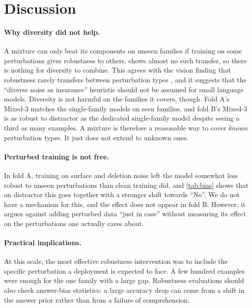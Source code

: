 \documentclass[11pt]{article}
\newcommand{\pfam}[1]{\textsf{#1}}
\begin{document}
\section{Discussion}
\label{sec:discussion}

\paragraph{Why diversity did not help.} A mixture can only beat its components on unseen families if training on some perturbations gives robustness to others.  shows almost no such transfer, so there is nothing for diversity to combine. This agrees with the vision finding that robustness rarely transfers between perturbation types \citep{kang2019transfer}, and it suggests that the ``diverse noise as insurance'' heuristic should not be assumed for small language models. Diversity is not harmful on the families it covers, though. Fold A's Mixed-3 matches the single-family models on seen families, and fold B's Mixed-3 is as robust to \pfam{distractor} as the dedicated single-family model despite seeing a third as many examples. A mixture is therefore a reasonable way to cover \emph{known} perturbation types. It just does not extend to unknown ones.

\paragraph{Perturbed training is not free.} In fold A, training on surface and deletion noise left the model somewhat less robust to unseen perturbations than clean training did, and \cref{tab:bias} shows that on \pfam{distractor} this goes together with a stronger shift towards ``No''. We do not have a mechanism for this, and the effect does not appear in fold B. However, it argues against adding perturbed data ``just in case'' without measuring its effect on the perturbations one actually cares about.

\paragraph{Practical implications.} At this scale, the most effective robustness intervention was to include the specific perturbation a deployment is expected to face. A few hundred examples were enough for the one family with a large gap. Robustness evaluations should also check answer-bias statistics: a large accuracy drop can come from a shift in the answer prior rather than from a failure of comprehension.
\end{document}
